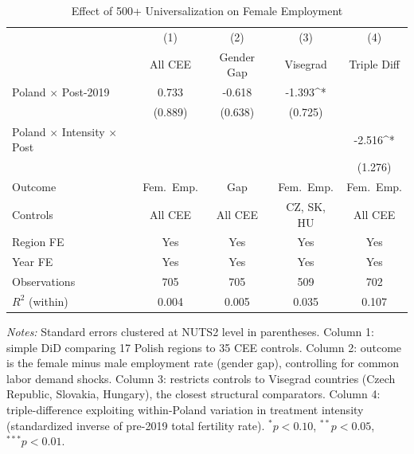 \begin{table}[htbp]
\centering
\caption{Effect of 500+ Universalization on Female Employment}
\label{tab:main}
\small
\begin{tabular}{lcccc}
\toprule
 & (1) & (2) & (3) & (4) \\
 & All CEE & Gender Gap & Visegrad & Triple Diff \\
\midrule
Poland $\times$ Post-2019 & 0.733 & -0.618 & -1.393^{*} & \\
 & (0.889) & (0.638) & (0.725) & \\
Poland $\times$ Intensity $\times$ Post & & & & -2.516^{*} \\
 & & & & (1.276) \\
\midrule
Outcome & Fem.\ Emp. & Gap & Fem.\ Emp. & Fem.\ Emp. \\
Controls & All CEE & All CEE & CZ, SK, HU & All CEE \\
Region FE & Yes & Yes & Yes & Yes \\
Year FE & Yes & Yes & Yes & Yes \\
Observations & 705 & 705 & 509 & 702 \\
$R^2$ (within) & 0.004 & 0.005 & 0.035 & 0.107 \\
\bottomrule
\end{tabular}
\begin{tablenotes}[flushleft]
\small
\item \textit{Notes:} Standard errors clustered at NUTS2 level in parentheses. Column 1: simple DiD comparing 17 Polish regions to 35 CEE controls. Column 2: outcome is the female minus male employment rate (gender gap), controlling for common labor demand shocks. Column 3: restricts controls to Visegrad countries (Czech Republic, Slovakia, Hungary), the closest structural comparators. Column 4: triple-difference exploiting within-Poland variation in treatment intensity (standardized inverse of pre-2019 total fertility rate). $^{*}p<0.10$, $^{**}p<0.05$, $^{***}p<0.01$.
\end{tablenotes}
\end{table}

